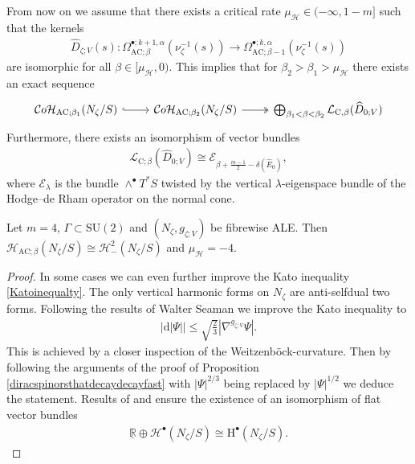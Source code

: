 \documentclass[psamsfonts]{amsart}
\theoremstyle{plain}
\theoremstyle{definition}{
\newtheorem{defi}{Definition}[section]
\newtheorem{ass}{Assumption}
\newtheorem*{nota}{Notation}}
\theoremstyle{remark}{
\newtheorem{rem}{Remark}
\newtheorem{ex}{Example}}
\theoremstyle{plain}{
\newtheorem{thm}{Theorem}[section]
\newtheorem{lem}{Lemma}[section]
\newtheorem{cor}{Corollary}[section]
\newtheorem{prop}{Proposition}[section]
\newtheorem{con}{Conjecture}[section]}
\newcommand{\m}[1]{{\mathrm{#1}}}
\begin{document}
\begin{rem}
From now on we assume that there exists a critical rate $\mu_{\mathcal{H}}\in(-\infty,1-m]$ such that the kernels 
\begin{align*}
    \widehat{D}_{\zeta;V}(s)\colon   \Omega^{\bullet;k+1,\alpha}_{\m{AC};\beta}(\nu_\zeta^{-1}(s))\rightarrow  \Omega^{\bullet;k,\alpha}_{\m{AC};\beta-1}(\nu_\zeta^{-1}(s))
\end{align*}
are isomorphic for all $\beta\in[\mu_{\mathcal{H}},0)$. This implies that for $\beta_2>\beta_1>\mu_{\mathcal{H}}$ there exists an exact sequence  
\begin{equation*}
    \begin{tikzcd}
	\mathcal{C}o\mathcal{H}_{\m{AC};\beta_1}(N_\zeta/S) &  \mathcal{C}o\mathcal{H}_{\m{AC};\beta_2}(N_\zeta/S) & {\bigoplus_{\beta_1<\beta<\beta_2}\mathcal{L}_{\m{C},\beta}(\widehat{D}_{0;V})}  
	\arrow[from=1-1, hook, to=1-2]
	\arrow[from=1-2,two heads, to=1-3]
\end{tikzcd}
\end{equation*}
Furthermore, there exists an isomorphism of vector bundles
\begin{align*}
    \mathcal{L}_{\m{C};\beta}(\widehat{D}_{0;V})\cong\mathcal{E}_{\beta+\frac{m-1}{2}-\delta(\widehat{E}_0)},
\end{align*}
where $\mathcal{E}_\lambda$ is the bundle $\wedge^\bullet T^*S$ twisted by the vertical $\lambda$-eigenspace bundle of the Hodge--de Rham operator on the normal cone.
\end{rem}




\begin{lem}
\label{imporveddecay}
Let $m=4$, $\Gamma\subset\m{SU}(2)$ and $(N_\zeta,g_{\zeta;V})$ be fibrewise ALE.
Then $\mathcal{H}_{\m{AC};\beta}(N_\zeta/S)\cong \mathcal{H}^2_{-}(N_\zeta/S)$ and $\mu_{\mathcal{H}}=-4$. 
\end{lem}

\begin{proof}

In some cases we can even further improve the Kato inequality \eqref{Katoinequalty}. The only vertical harmonic forms on $N_\zeta$ are anti-selfdual two forms. Following the results of Walter Seaman \cite{seaman1991} we improve the Kato inequality to 
\begin{align}
\label{improvedKatoinequalty}
    |\m{d}|\Psi||\leq\sqrt{\frac{2}{3}}|\nabla^{g_{\zeta;V}}\Psi|.
\end{align}
This is achieved by a closer inspection of the Weitzenböck-curvature. Then by following the arguments of the proof of Proposition \ref{diracspinorsthatdecaydecayfast} with $|\Psi|^{2/3}$ being replaced by $|\Psi|^{1/2}$ we deduce the statement. Results of \cite{lockhart1987fredholm} and \cite{joyce2000compact} ensure the existence of an isomorphism of flat vector bundles
\begin{align*}
    \underline{\mathbb{R}}\oplus\mathcal{H}^\bullet(N_\zeta/S)\cong\m{H}^\bullet(N_\zeta/S).
\end{align*}  
\end{proof}
\end{document}
